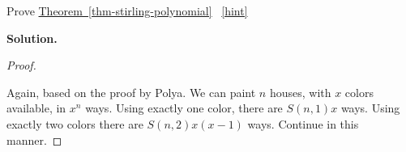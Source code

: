 \documentclass{book}
\begin{document}
\setcounter{project}{287}
\addtocounter{project}{-1}
\begin{activity}[]\label{activity-280}
\hypertarget{p-1502}{}%
Prove \hyperref[thm-stirling-polynomial]{Theorem~\ref{thm-stirling-polynomial}}%
~\hfill{\tiny\hyperlink{a-287}{[hint]}\hypertarget{q-287}{}}\par\smallskip%
\noindent\textbf{Solution.}\hypertarget{solution-216}{}\quad%
\begin{proof}\hypertarget{proof-8}{}
\hypertarget{p-1504}{}%
Again, based on the proof by Polya. We can paint \(n\) houses, with \(x\) colors available, in \(x^{n}\) ways. Using exactly one color, there are \(S\left( n,1 \right)x\) ways. Using exactly two colors there are \(S\left( n,2 \right)x(x - 1)\) ways. Continue in this manner.%
\end{proof}
\end{activity}
\end{document}
